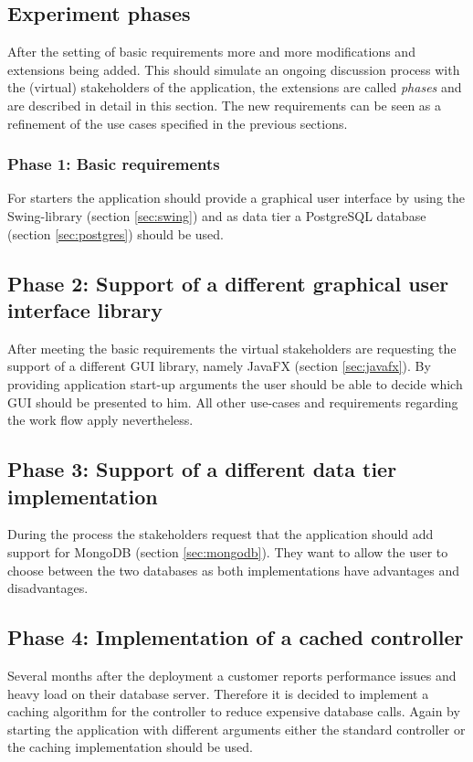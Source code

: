 \subsection{Experiment phases}
After the setting of basic requirements more and more modifications and extensions being added. This should simulate an ongoing discussion process with the (virtual) stakeholders of the application, the extensions are called \emph{phases} and are described in detail in this section. The new requirements can be seen as a refinement of the use cases specified in the previous sections.

\subsubsection{Phase 1: Basic requirements} 
For starters the application should provide a graphical user interface by using the Swing-library (section \ref{sec:swing}) and as data tier a PostgreSQL database (section \ref{sec:postgres}) should be used.

\subsection{Phase 2: Support of a different graphical user interface library}
After meeting the basic requirements the virtual stakeholders are requesting the support of a different GUI library, namely JavaFX (section \ref{sec:javafx}). By providing application start-up arguments the user should be able to decide which GUI should be presented to him. All other use-cases and requirements regarding the work flow apply nevertheless.

\subsection{Phase 3: Support of a different data tier implementation}
During the process the stakeholders request that the application should add support for MongoDB (section \ref{sec:mongodb}). They want to allow the user to choose between the two databases as both implementations have advantages and disadvantages. 

\subsection{Phase 4: Implementation of a cached controller}
Several months after the deployment a customer reports performance issues and heavy load on their database server. Therefore it is decided to implement a caching algorithm for the controller to reduce expensive database calls. Again by starting the application with different arguments either the standard controller or the caching implementation should be used.


